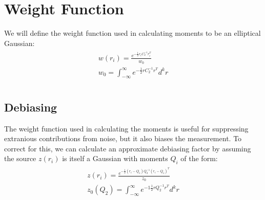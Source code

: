 \documentclass[letterpaper,10pt,english]{sphinxmanual}
\begin{document}
\chapter{Weight Function}
\label{\detokenize{algorithmWriteup:weight-function}}
We will define the weight function used in calculating moments to be an
elliptical Gaussian:
\begin{align*}\!\begin{aligned}
w(r_i) = \frac{e^{-\frac{1}{2}r_iC^{-1}_2r_i^T}}{w_0}\\
w_0 = \int_{-\infty}^{\infty}e^{-\frac{1}{2}rC^{-1}_2r^T}d^kr\\
\end{aligned}\end{align*}

\section{Debiasing}
\label{\detokenize{algorithmWriteup:debiasing}}
The weight function used in calculating the moments is useful for suppressing
extranious contributions from noise, but it also biases the measurement. To
correct for this, we can calculate an approximate debiasing factor by assuming
the source \(z(r_i)\) is itself a Gaussian with moments \(Q_i\) of the
form:
\begin{align*}\!\begin{aligned}
z(r_i) = \frac{e^{-\frac{1}{2}(r_i - Q_1) Q_2^{-1}(r_i-Q_1)^T}}{z_0}\\
z_0(Q_2) = \int_{-\infty}^{\infty}e^{-1\frac{1}{2}rQ^{-1}_2r^T}d^kr\\
\end{aligned}\end{align*}
\end{document}
